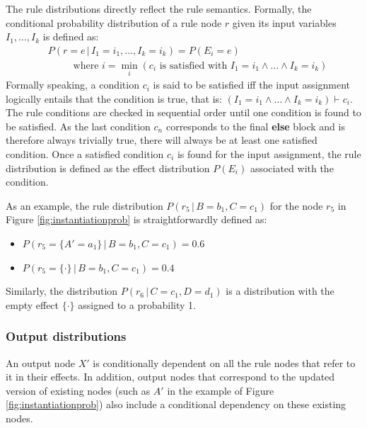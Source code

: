 The rule distributions directly reflect the rule semantics.  Formally, the conditional probability distribution of a rule node $r$ given its input variables $I_1, \dots, I_k$ is defined as: 
\begin{align}
& P(r\!=\!e \, | \, I_1\!=\!i_1, \dots, I_k\!=\!i_k) = P(E_i = e) \label{eq:ruledistrib}
 \\ 
& \; \; \; \; \; \; \; \; \text{ where } i = \min_i (c_i \text{ is satisfied with } I_1\!=\!i_1 \land \dots \land I_k\!=\!i_k) \nonumber 
\end{align}
Formally speaking, a condition $c_i$ is said to be satisfied iff the input assignment logically entails that the condition is true, that is: $(I_1\!=\!i_1 \land \dots \land I_k\!=\!i_k) \vdash c_i$. The rule conditions are checked in sequential order until one condition is found to be satisfied. As the last condition $c_n$ corresponds to the final \textbf{else} block and is therefore always trivially true, there will always be at least one satisfied condition. Once a satisfied condition $c_i$ is found for the input assignment, the rule distribution is defined as the effect distribution $P(E_i)$ associated with the condition.

As an example, the rule distribution $P(r_5 \, | \, B\!=\!b_1, C\!=\!c_1)$ for the node $r_5$ in Figure \ref{fig:instantiationprob} is straightforwardly defined as:
\begin{itemize}
\item $P(r_5 = \{A'\!=\!a_1\} \, | \, B\!=\!b_1, C\!=\!c_1) = 0.6$
\item  $P(r_5 = \{\cdot\} \, | \, B\!=\!b_1, C\!=\!c_1) = 0.4$
\end{itemize}

Similarly, the distribution $P(r_6 \, | \, C\!=\!c_1, D\!=\!d_1)$ is a distribution with the empty effect $\{\cdot\}$ assigned to a probability 1. 

\subsubsection*{Output distributions} 

An output node $X'$ is conditionally dependent on all the rule nodes that refer to it in their effects.  In addition, output nodes that correspond to the updated version of existing nodes (such as $A'$ in the example of Figure \ref{fig:instantiationprob}) also include a conditional dependency on these existing nodes.

